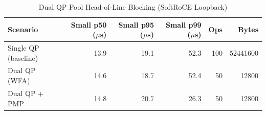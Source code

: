 \begin{table}[h]
\centering
\caption{Dual QP Pool Head-of-Line Blocking (SoftRoCE Loopback)}
\label{tab:dual_qp_results}
\begin{tabular}{lrrrrr}
\toprule
Scenario & Small p50 ($\mu$s) & Small p95 ($\mu$s) & Small p99 ($\mu$s) & Ops & Bytes \\
\midrule
  Single QP (baseline) & 13.9 & 19.1 & 52.3 & 100 & 52441600 \\
  Dual QP (WFA) & 14.6 & 18.7 & 52.4 & 50 & 12800 \\
  Dual QP + PMP & 14.8 & 20.7 & 26.3 & 50 & 12800 \\
\bottomrule
\end{tabular}
\end{table}
